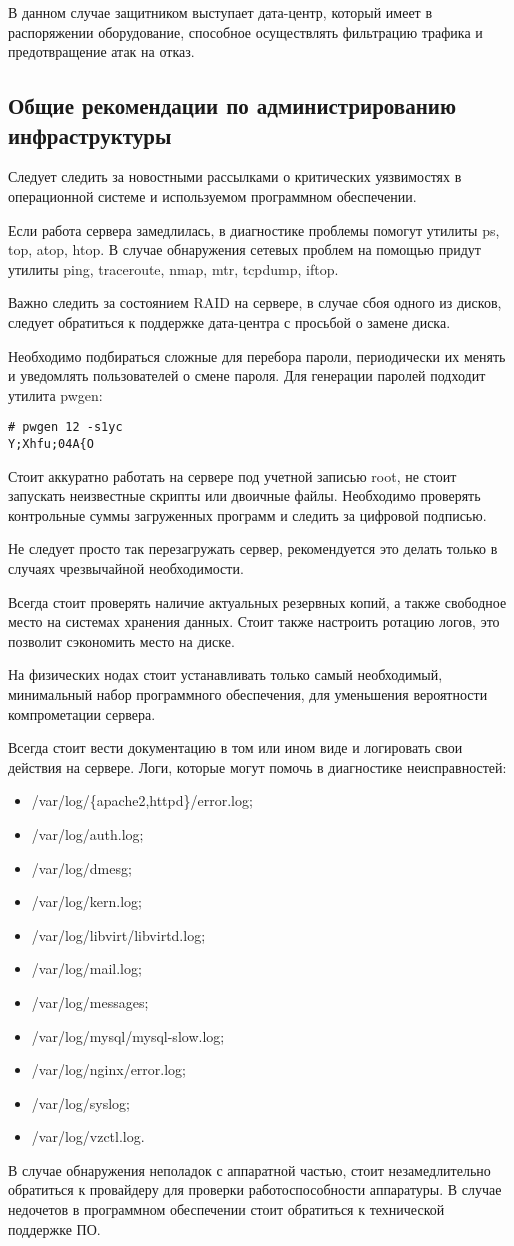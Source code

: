 В данном случае защитником выступает дата-центр, который имеет в распоряжении оборудование, способное осуществлять фильтрацию трафика и предотвращение атак на отказ.

\subsection{Общие рекомендации по администрированию инфраструктуры}

Следует следить за новостными рассылками о критических уязвимостях в операционной системе и используемом программном обеспечении.

Если работа сервера замедлилась, в диагностике проблемы помогут утилиты ps, top, atop, htop.
В случае обнаружения сетевых проблем на помощью придут утилиты ping, traceroute, nmap, mtr, tcpdump, iftop.

Важно следить за состоянием RAID на сервере, в случае сбоя одного из дисков, следует обратиться к поддержке дата-центра с просьбой о замене диска.

Необходимо подбираться сложные для перебора пароли, периодически их менять и уведомлять пользователей о смене пароля.
Для генерации паролей подходит утилита pwgen:
\begin{lstlisting}
# pwgen 12 -s1yc
Y;Xhfu;04A{O
\end{lstlisting}

Стоит аккуратно работать на сервере под учетной записью root, не стоит запускать неизвестные скрипты или двоичные файлы.
Необходимо проверять контрольные суммы загруженных программ и следить за цифровой подписью.

Не следует просто так перезагружать сервер, рекомендуется это делать только в случаях чрезвычайной необходимости.

Всегда стоит проверять наличие актуальных резервных копий, а также свободное место на системах хранения данных.
Стоит также настроить ротацию логов, это позволит сэкономить место на диске.

На физических нодах стоит устанавливать только самый необходимый, минимальный набор программного обеспечения, для уменьшения вероятности компрометации сервера.

Всегда стоит вести документацию в том или ином виде и логировать свои действия на сервере.
Логи, которые могут помочь в диагностике неисправностей:
\begin{itemize}
  \item /var/log/\{apache2,httpd\}/error.log;
  \item /var/log/auth.log;
  \item /var/log/dmesg;
  \item /var/log/kern.log;
  \item /var/log/libvirt/libvirtd.log;
  \item /var/log/mail.log;
  \item /var/log/messages;
  \item /var/log/mysql/mysql-slow.log;
  \item /var/log/nginx/error.log;
  \item /var/log/syslog;
  \item /var/log/vzctl.log.
\end{itemize}

В случае обнаружения неполадок с аппаратной частью, стоит незамедлительно обратиться к провайдеру для проверки работоспособности аппаратуры.
В случае недочетов в программном обеспечении стоит обратиться к технической поддержке ПО.

\clearpage
